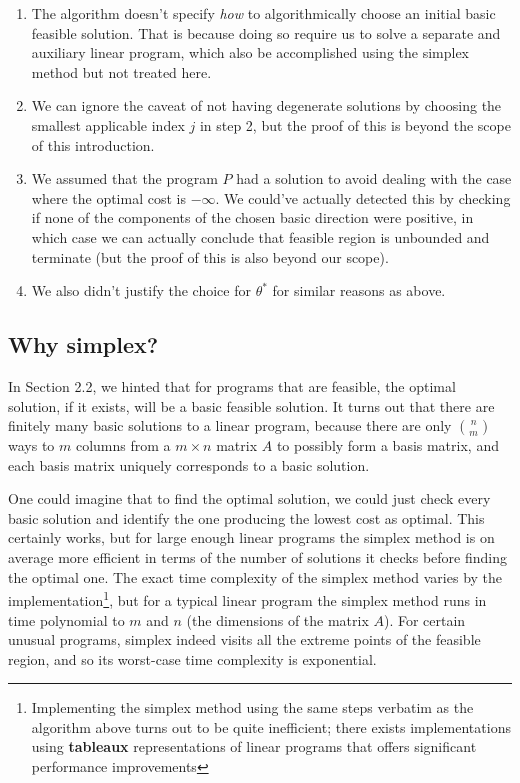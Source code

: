\documentclass{paper}
\begin{document}
\bigskip
\begin{enumerate}
    \item The algorithm doesn't specify \textit{how} to algorithmically choose an initial basic feasible solution. That is because doing so require us to solve a separate and auxiliary linear program, which also be accomplished using the simplex method but not treated here.
    
    \item  We can ignore the caveat of not having degenerate solutions by choosing the smallest applicable index $j$ in step 2, but the proof of this is beyond the scope of this introduction.
    
    \item We assumed that the program $P$ had a solution to avoid dealing with the case where the optimal cost is $-\infty$. We could've actually detected this by checking if none of the components of the chosen basic direction were positive, in which case we can actually conclude that feasible region is unbounded and terminate (but the proof of this is also beyond our scope).
    
    \item We also didn't justify the choice for $\theta^*$ for similar reasons as above.
\end{enumerate}
 
\medskip
\subsection{Why simplex?}

In Section 2.2, we hinted that for programs that are feasible, the optimal solution, if it exists, will be a basic feasible solution. It turns out that there are finitely many basic solutions to a linear program, because there are only $n \choose m$ ways to $m$ columns from a $m \times n$ matrix $A$ to possibly form a basis matrix, and each basis matrix uniquely corresponds to a basic solution.  

\medskip
One could imagine that to find the optimal solution, we could just check every basic solution and identify the one producing the lowest cost as optimal. This certainly works, but for large enough linear programs the simplex method is on average more efficient in terms of the number of solutions it checks before finding the optimal one. The exact time complexity of the simplex method varies by the implementation\footnote{Implementing the simplex method using the same steps verbatim as the algorithm above turns out to be quite inefficient; there exists implementations using \textbf{tableaux} representations of linear programs that offers significant performance improvements}, but for a typical linear program the simplex method runs in time polynomial to $m$ and $n$ (the dimensions of the matrix $A$). For certain unusual programs, simplex indeed visits all the extreme points of the feasible region, and so its worst-case time complexity is exponential.
\end{document}
